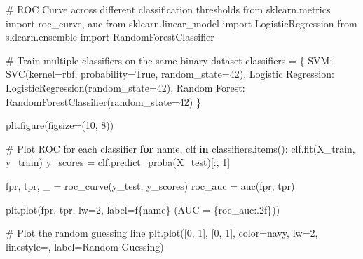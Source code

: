 \documentclass[
  letterpaper,
  DIV=11,
  numbers=noendperiod]{scrreprt}
\newenvironment{Shaded}{\begin{snugshade}}{\end{snugshade}}
\newcommand{\CommentTok}[1]{\textcolor[rgb]{0.37,0.37,0.37}{#1}}
\newcommand{\ControlFlowTok}[1]{\textcolor[rgb]{0.00,0.23,0.31}{\textbf{#1}}}
\newcommand{\DecValTok}[1]{\textcolor[rgb]{0.68,0.00,0.00}{#1}}
\newcommand{\ImportTok}[1]{\textcolor[rgb]{0.00,0.46,0.62}{#1}}
\newcommand{\KeywordTok}[1]{\textcolor[rgb]{0.00,0.23,0.31}{\textbf{#1}}}
\newcommand{\NormalTok}[1]{\textcolor[rgb]{0.00,0.23,0.31}{#1}}
\newcommand{\OperatorTok}[1]{\textcolor[rgb]{0.37,0.37,0.37}{#1}}
\newcommand{\SpecialCharTok}[1]{\textcolor[rgb]{0.37,0.37,0.37}{#1}}
\newcommand{\SpecialStringTok}[1]{\textcolor[rgb]{0.13,0.47,0.30}{#1}}
\newcommand{\StringTok}[1]{\textcolor[rgb]{0.13,0.47,0.30}{#1}}
\newcommand{\VariableTok}[1]{\textcolor[rgb]{0.07,0.07,0.07}{#1}}
\begin{document}
\begin{Shaded}
\begin{Highlighting}[]
\CommentTok{\# ROC Curve across different classification thresholds}
\ImportTok{from}\NormalTok{ sklearn.metrics }\ImportTok{import}\NormalTok{ roc\_curve, auc}
\ImportTok{from}\NormalTok{ sklearn.linear\_model }\ImportTok{import}\NormalTok{ LogisticRegression}
\ImportTok{from}\NormalTok{ sklearn.ensemble }\ImportTok{import}\NormalTok{ RandomForestClassifier}

\CommentTok{\# Train multiple classifiers on the same binary dataset}
\NormalTok{classifiers }\OperatorTok{=}\NormalTok{ \{}
    \StringTok{\textquotesingle{}SVM\textquotesingle{}}\NormalTok{: SVC(kernel}\OperatorTok{=}\StringTok{\textquotesingle{}rbf\textquotesingle{}}\NormalTok{, probability}\OperatorTok{=}\VariableTok{True}\NormalTok{, random\_state}\OperatorTok{=}\DecValTok{42}\NormalTok{),}
    \StringTok{\textquotesingle{}Logistic Regression\textquotesingle{}}\NormalTok{: LogisticRegression(random\_state}\OperatorTok{=}\DecValTok{42}\NormalTok{),}
    \StringTok{\textquotesingle{}Random Forest\textquotesingle{}}\NormalTok{: RandomForestClassifier(random\_state}\OperatorTok{=}\DecValTok{42}\NormalTok{)}
\NormalTok{\}}

\NormalTok{plt.figure(figsize}\OperatorTok{=}\NormalTok{(}\DecValTok{10}\NormalTok{, }\DecValTok{8}\NormalTok{))}

\CommentTok{\# Plot ROC for each classifier}
\ControlFlowTok{for}\NormalTok{ name, clf }\KeywordTok{in}\NormalTok{ classifiers.items():}
\NormalTok{    clf.fit(X\_train, y\_train)}
\NormalTok{    y\_scores }\OperatorTok{=}\NormalTok{ clf.predict\_proba(X\_test)[:, }\DecValTok{1}\NormalTok{]}
    
\NormalTok{    fpr, tpr, \_ }\OperatorTok{=}\NormalTok{ roc\_curve(y\_test, y\_scores)}
\NormalTok{    roc\_auc }\OperatorTok{=}\NormalTok{ auc(fpr, tpr)}
    
\NormalTok{    plt.plot(fpr, tpr, lw}\OperatorTok{=}\DecValTok{2}\NormalTok{, label}\OperatorTok{=}\SpecialStringTok{f\textquotesingle{}}\SpecialCharTok{\{}\NormalTok{name}\SpecialCharTok{\}}\SpecialStringTok{ (AUC = }\SpecialCharTok{\{}\NormalTok{roc\_auc}\SpecialCharTok{:.2f\}}\SpecialStringTok{)\textquotesingle{}}\NormalTok{)}

\CommentTok{\# Plot the random guessing line}
\NormalTok{plt.plot([}\DecValTok{0}\NormalTok{, }\DecValTok{1}\NormalTok{], [}\DecValTok{0}\NormalTok{, }\DecValTok{1}\NormalTok{], color}\OperatorTok{=}\StringTok{\textquotesingle{}navy\textquotesingle{}}\NormalTok{, lw}\OperatorTok{=}\DecValTok{2}\NormalTok{, linestyle}\OperatorTok{=}\StringTok{\textquotesingle{}{-}{-}\textquotesingle{}}\NormalTok{, label}\OperatorTok{=}\StringTok{\textquotesingle{}Random Guessing\textquotesingle{}}\NormalTok{)}


\end{Highlighting}
\end{Shaded}
\end{document}
